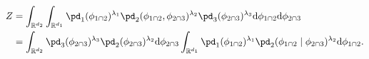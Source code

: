 \begin{align}
Z &=
  \int_{\mathbb{R}^{d_{2}}}
  \int_{\mathbb{R}^{d_{1}}} 
    \pd_{1}(\phi_{1 \cap 2})^{\lambda_{1}} 
    \pd_{2}(\phi_{1 \cap 2}, \phi_{2 \cap 3})^{\lambda_{2}}
    \pd_{3}(\phi_{2 \cap 3})^{\lambda_{3}}
  \text{d}\phi_{1 \cap 2}
  \text{d}\phi_{2 \cap 3}   \label{eqn:int-pooled-prior-overall-1} \\
  &=
  \int_{\mathbb{R}^{d_{2}}}
    \pd_{3}(\phi_{2 \cap 3})^{\lambda_{3}}
    \pd_{2}(\phi_{2 \cap 3})^{\lambda_{2}}
  \text{d}\phi_{2 \cap 3}
  \int_{\mathbb{R}^{d_{1}}} 
    \pd_{1}(\phi_{1 \cap 2})^{\lambda_{1}} 
    \pd_{2}(\phi_{1 \cap 2} \mid \phi_{2 \cap 3})^{\lambda_{2}}  
  \text{d}\phi_{1 \cap 2}.
     \label{eqn:int-pooled-prior-overall-2}
\end{align}